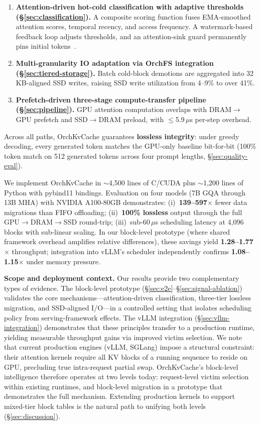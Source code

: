 \documentclass[conference]{IEEEtran}
\begin{document}
\begin{enumerate}
\item \textbf{Attention-driven hot-cold classification with adaptive thresholds (\S\ref{sec:classification}).} A composite scoring function fuses EMA-smoothed attention scores, temporal recency, and access frequency. A watermark-based feedback loop adjusts thresholds, and an attention-sink guard permanently pins initial tokens~\cite{streamingllm}.

\item \textbf{Multi-granularity IO adaptation via OrchFS integration (\S\ref{sec:tiered-storage}).} Batch cold-block demotions are aggregated into 32\,KB-aligned SSD writes, raising SSD write utilization from 4--9\% to over 41\%.

\item \textbf{Prefetch-driven three-stage compute-transfer pipeline (\S\ref{sec:pipeline}).} GPU attention computation overlaps with DRAM$\to$GPU prefetch and SSD$\to$DRAM preload, with $\leq$5.9\,$\mu$s per-step overhead.
\end{enumerate}

Across all paths, OrchKvCache guarantees \textbf{lossless integrity}: under greedy decoding, every generated token matches the GPU-only baseline bit-for-bit (100\% token match on 512 generated tokens across four prompt lengths, \S\ref{sec:quality-eval}).

We implement OrchKvCache in ${\sim}$4,500 lines of C/CUDA plus ${\sim}$1,200 lines of Python with pybind11 bindings. Evaluation on four models (7B GQA through 13B MHA) with NVIDIA A100-80GB demonstrates: (i)~\textbf{139--597$\times$} fewer data migrations than FIFO offloading; (ii)~\textbf{100\% lossless} output through the full GPU$\to$DRAM$\to$SSD round-trip; (iii)~sub-60\,$\mu$s scheduling latency at 4,096 blocks with sub-linear scaling. In our block-level prototype (where shared framework overhead amplifies relative differences), these savings yield \textbf{1.28--1.77$\times$} throughput; integration into vLLM's scheduler independently confirms \textbf{1.08--1.15$\times$} under memory pressure.

\textbf{Scope and deployment context.} Our results provide two complementary types of evidence. The block-level prototype (\S\ref{sec:e2e}--\S\ref{sec:signal-ablation}) validates the core mechanisms---attention-driven classification, three-tier lossless migration, and SSD-aligned I/O---in a controlled setting that isolates scheduling policy from serving-framework effects. The vLLM integration (\S\ref{sec:vllm-integration}) demonstrates that these principles transfer to a production runtime, yielding measurable throughput gains via improved victim selection. We note that current production engines (vLLM, SGLang) impose a structural constraint: their attention kernels require all KV blocks of a running sequence to reside on GPU, precluding true intra-request partial swap. OrchKvCache's block-level intelligence therefore operates at two levels today: request-level victim selection within existing runtimes, and block-level migration in a prototype that demonstrates the full mechanism. Extending production kernels to support mixed-tier block tables is the natural path to unifying both levels (\S\ref{sec:discussion}).
\end{document}
